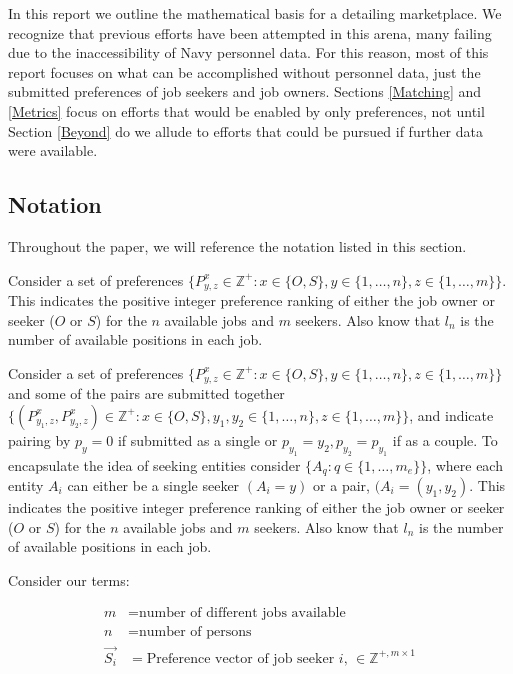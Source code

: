 In this report we outline the mathematical basis for a detailing marketplace. We recognize that previous efforts have been attempted in this arena, many failing due to the inaccessibility of Navy personnel data. For this reason, most of this report focuses on what can be accomplished without personnel data, just the submitted preferences of job seekers and job owners.  Sections \ref{Matching} and \ref{Metrics} focus on efforts that would be enabled by only preferences, not until Section \ref{Beyond} do we allude to efforts that could be pursued if further data were available.

\subsection{Notation}

Throughout the paper, we will reference the notation listed in this section.

Consider a set of preferences $\{P^{x}_{y,z} \in \mathbb{Z}^+: x \in \{O,S\}, y \in \{1, \dots, n\}, z \in \{1, \dots, m\}\}$. This indicates the positive integer preference ranking of either the job owner or seeker ($O$ or $S$) for the $n$ available jobs and $m$ seekers. Also know that $l_n$ is the number of available positions in each job.\;

Consider a set of preferences $\{P^{x}_{y,z} \in \mathbb{Z}^+: x \in \{O,S\}, y \in \{1, \dots, n\}, z \in \{1, \dots, m\}\}$ and some of the pairs are submitted together $\{(P^{x}_{y_1,z}, P^{x}_{y_2,z}) \in \mathbb{Z}^+: x \in \{O,S\}, y_1,y_2 \in \{1, \dots, n\}, z \in \{1, \dots, m\}\}$, and indicate pairing by $p_y = 0$ if submitted as a single or $p_{y_1}=y_2, p_{y_2}=p_{y_1}$ if as a couple. To encapsulate the idea of seeking entities consider $\{A_q : q \in \{1, \dots, m_e\}\}$, where each entity $A_i$ can either be a single seeker $(A_i = y)$ or a pair, $(A_i = (y_1, y_2)$. This indicates the positive integer preference ranking of either the job owner or seeker ($O$ or $S$) for the $n$ available jobs and $m$ seekers. Also know that $l_n$ is the number of available positions in each job.\;


Consider our terms:

\begin{align}
m &= \text{number of different jobs available}\\
n &= \text{number of persons}\\
\vec{S_i} &= \text{Preference vector of job seeker $i$, } \in \mathbb{Z}^{+, m \times 1} \\
\end{align}



